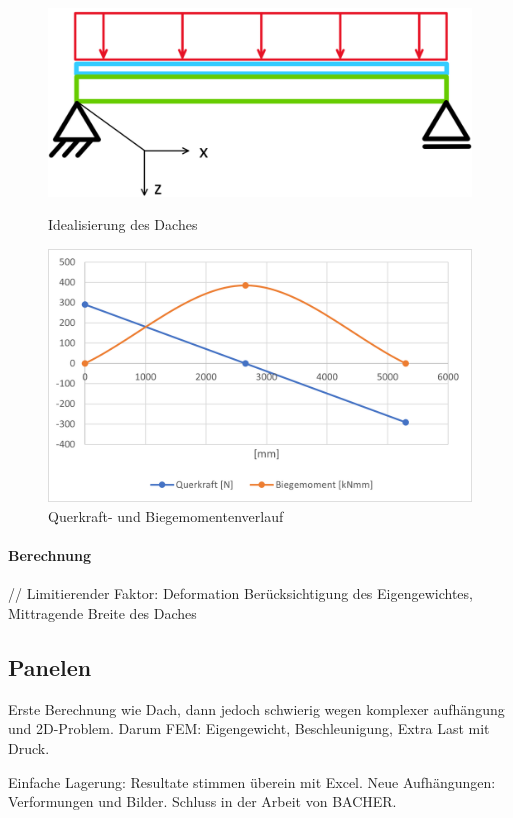 \begin{figure}[h]
\centering
\begin{minipage}{.4\textwidth}
  \centering
  \includegraphics[width=.98\linewidth]{04_figures/Dach Idealisierung.png}
  \caption{Idealisierung des Daches}
  \label{Dach Idealisierung}
\end{minipage}%
\begin{minipage}{.6\textwidth}
  \centering
  \includegraphics[width=.98\linewidth]{04_figures/Dach QM.png}
  \caption{Querkraft- und Biegemomentenverlauf}
  \label{Dach QM}
\end{minipage}
\end{figure}



  \paragraph{Berechnung}\mbox{}//
    Limitierender Faktor: Deformation
    Berücksichtigung des Eigengewichtes,
    Mittragende Breite des Daches


\subsection{Panelen}
  Erste Berechnung wie Dach, dann jedoch schwierig wegen komplexer aufhängung und 2D-Problem.
  Darum FEM:
    Eigengewicht, Beschleunigung, Extra Last mit Druck.

  Einfache Lagerung: Resultate stimmen überein mit Excel.
  Neue Aufhängungen:
    Verformungen und Bilder.
    Schluss in der Arbeit von BACHER.

\newpage
